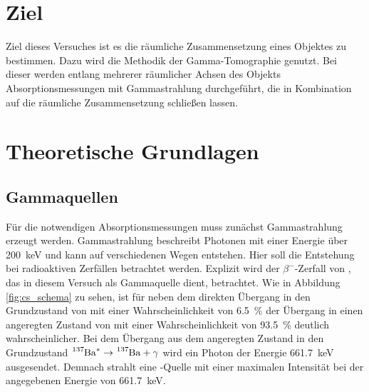 \section{Ziel}
    Ziel dieses Versuches ist es die räumliche Zusammensetzung eines Objektes zu bestimmen. Dazu wird die Methodik der Gamma-Tomographie genutzt. Bei dieser werden entlang mehrerer räumlicher
    Achsen des Objekts Absorptionsmessungen mit Gammastrahlung durchgeführt, die in Kombination auf die räumliche Zusammensetzung schließen lassen.   
    
\section{Theoretische Grundlagen}
    \subsection{Gammaquellen}

        Für die notwendigen Absorptionsmessungen muss zunächst Gammastrahlung erzeugt werden. Gammastrahlung beschreibt Photonen mit einer Energie über \SI{200}{\kilo\electronvolt} und kann auf verschiedenen
        Wegen entstehen. Hier soll die Entstehung bei radioaktiven Zerfällen betrachtet werden. Explizit wird der $\beta^-$-Zerfall von , das in diesem Versuch als Gammaquelle dient, betrachtet. 
        Wie in Abbildung \ref{fig:cs_schema} zu sehen, 
        ist für  neben dem direkten Übergang in den Grundzustand von  mit einer Wahrscheinlichkeit von \SI{6.5}{\percent} der Übergang in einen angeregten Zustand von  mit
        einer Wahrscheinlichkeit von \SI{93.5}{\percent} deutlich wahrscheinlicher. Bei dem Übergang aus dem angeregten Zustand in den Grundzustand $ \ce{^{137}Ba}^* \rightarrow \ce{^{137}Ba} + \gamma$ wird ein 
        Photon der Energie \SI{661.7}{\kilo\electronvolt} ausgesendet. Demnach strahlt eine -Quelle mit einer maximalen Intensität bei der angegebenen Energie von \SI{661.7}{\kilo\electronvolt}.


